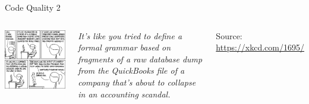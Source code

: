 
\begin{frame}[t,plain]
\titlepage
\end{frame}


\begin{frame}{Code Quality 2}
%
\begin{columns}
\includegraphics[width=1.3\linewidth]{./gfx/16-xkcd-code_quality_2}

\emph{It's like you tried to define a formal grammar based on fragments of a raw database dump from the QuickBooks file of a company that's about to collapse in an accounting scandal.}

\vspace{12pt}
Source: \url{https://xkcd.com/1695/}
\end{columns}
%
\end{frame}


